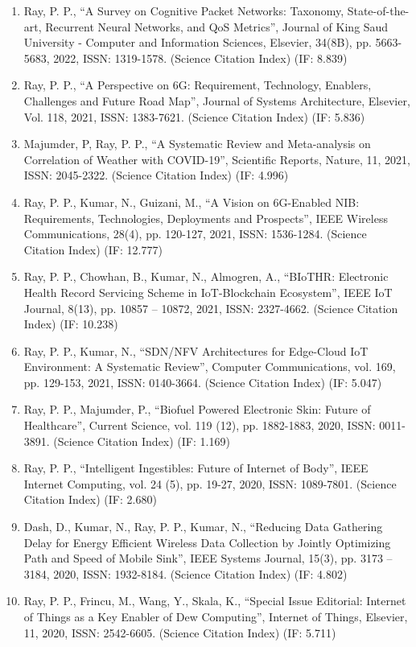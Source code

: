 \documentclass[11pt,a4paper]{moderncv}
\begin{document}
\begin{adjustwidth}{6em}{0pt}
\begin{enumerate}
		
		\item Ray, P. P., “A Survey on Cognitive Packet Networks: Taxonomy, State-of-the-art, Recurrent Neural Networks, and QoS Metrics”, Journal of King Saud University - Computer and Information Sciences, Elsevier, 34(8B), pp. 5663-5683, 2022, ISSN: 1319-1578. (Science Citation Index) (IF: 8.839) 
		\item Ray, P. P., “A Perspective on 6G: Requirement, Technology, Enablers, Challenges and Future Road Map”, Journal of Systems Architecture, Elsevier, Vol. 118, 2021, ISSN: 1383-7621. (Science Citation Index) (IF: 5.836)  
		\item Majumder, P, Ray, P. P., “A Systematic Review and Meta-analysis on Correlation of Weather with COVID-19”, Scientific Reports, Nature, 11, 2021, ISSN: 2045-2322. (Science Citation Index) (IF: 4.996) 
		\item Ray, P. P., Kumar, N., Guizani, M., “A Vision on 6G-Enabled NIB: Requirements, Technologies, Deployments and Prospects”, IEEE Wireless Communications, 28(4), pp. 120-127, 2021, ISSN: 1536-1284. (Science Citation Index) (IF: 12.777) 
		\item Ray, P. P., Chowhan, B., Kumar, N., Almogren, A., “BIoTHR: Electronic Health Record Servicing Scheme in IoT-Blockchain Ecosystem”, IEEE IoT Journal, 8(13), pp. 10857 – 10872, 2021, ISSN: 2327-4662. (Science Citation Index) (IF: 10.238)
		\item Ray, P. P., Kumar, N., “SDN/NFV Architectures for Edge-Cloud IoT Environment: A Systematic Review”, Computer Communications, vol. 169, pp. 129-153, 2021, ISSN: 0140-3664. (Science Citation Index) (IF: 5.047)
		\item Ray, P. P., Majumder, P., “Biofuel Powered Electronic Skin: Future of Healthcare”, Current Science, vol. 119 (12), pp. 1882-1883, 2020, ISSN: 0011-3891. (Science Citation Index) (IF: 1.169) 
		\item Ray, P. P., “Intelligent Ingestibles: Future of Internet of Body”, IEEE Internet Computing, vol. 24 (5), pp. 19-27, 2020, ISSN: 1089-7801. (Science Citation Index) (IF: 2.680) 
		\item Dash, D., Kumar, N., Ray, P. P., Kumar, N., “Reducing Data Gathering Delay for Energy Efficient Wireless Data Collection by Jointly Optimizing Path and Speed of Mobile Sink”, IEEE Systems Journal, 15(3), pp. 3173 – 3184, 2020, ISSN: 1932-8184. (Science Citation Index) (IF: 4.802)
		\item Ray, P. P., Frincu, M., Wang, Y., Skala, K., “Special Issue Editorial: Internet of Things as a Key Enabler of Dew Computing”, Internet of Things, Elsevier, 11, 2020, ISSN: 2542-6605. (Science Citation Index) (IF: 5.711)

\end{enumerate}
\end{adjustwidth}
\end{document}
